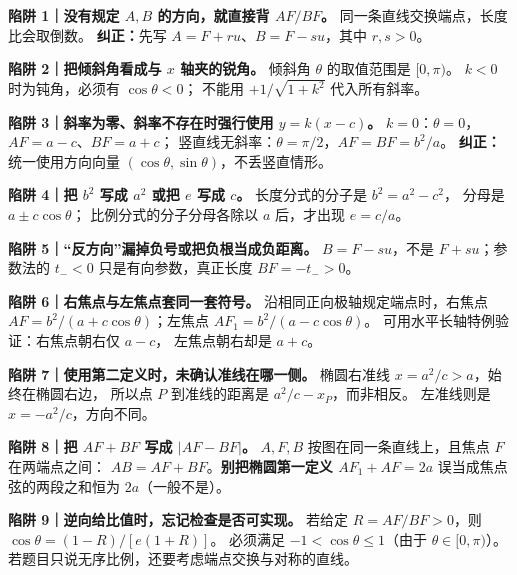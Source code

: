 \clearpage
\begin{trapbox}
\textbf{陷阱 1｜没有规定 $A,B$ 的方向，就直接背 $AF/BF$。}
同一条直线交换端点，长度比会取倒数。
\textbf{纠正：}先写 $A=F+ru$、$B=F-su$，其中 $r,s>0$。
\par\smallskip\noindent
\textbf{陷阱 2｜把倾斜角看成与 $x$ 轴夹的锐角。}
倾斜角 $\theta$ 的取值范围是 $[0,\pi)$。
$k<0$ 时为钝角，必须有 $\cos\theta<0$；
不能用 $+1/\sqrt{1+k^2}$ 代入所有斜率。
\par\smallskip\noindent
\textbf{陷阱 3｜斜率为零、斜率不存在时强行使用 $y=k(x-c)$。}
$k=0$：$\theta=0$，$AF=a-c$、$BF=a+c$；
竖直线无斜率：$\theta=\pi/2$，$AF=BF=b^2/a$。
\textbf{纠正：}统一使用方向向量 $(\cos\theta,\sin\theta)$，不丢竖直情形。
\par\smallskip\noindent
\textbf{陷阱 4｜把 $b^2$ 写成 $a^2$ 或把 $e$ 写成 $c$。}
长度分式的分子是 $b^2=a^2-c^2$，
分母是 $a\pm c\cos\theta$；
比例分式的分子分母各除以 $a$ 后，才出现 $e=c/a$。
\par\smallskip\noindent
\textbf{陷阱 5｜``反方向''漏掉负号或把负根当成负距离。}
$B=F-su$，不是 $F+su$；参数法的 $t_-<0$
只是有向参数，真正长度 $BF=-t_->0$。
\par\smallskip\noindent
\textbf{陷阱 6｜右焦点与左焦点套同一套符号。}
沿相同正向极轴规定端点时，右焦点
$AF=b^2/(a+c\cos\theta)$；左焦点
$AF_1=b^2/(a-c\cos\theta)$。
可用水平长轴特例验证：右焦点朝右仅 $a-c$，
左焦点朝右却是 $a+c$。
\par\smallskip\noindent
\textbf{陷阱 7｜使用第二定义时，未确认准线在哪一侧。}
椭圆右准线 $x=a^2/c>a$，始终在椭圆右边，
所以点 $P$ 到准线的距离是 $a^2/c-x_P$，而非相反。
左准线则是 $x=-a^2/c$，方向不同。
\par\smallskip\noindent
\textbf{陷阱 8｜把 $AF+BF$ 写成 $|AF-BF|$。}
$A,F,B$ 按图在同一条直线上，且焦点 $F$ 在两端点之间：
$AB=AF+BF$。\textbf{别把椭圆第一定义 $AF_1+AF=2a$}
误当成焦点弦的两段之和恒为 $2a$（一般不是）。
\par\smallskip\noindent
\textbf{陷阱 9｜逆向给比值时，忘记检查是否可实现。}
若给定 $R=AF/BF>0$，则
$\cos\theta=(1-R)/[e(1+R)]$。
必须满足 $-1<\cos\theta\le1$（由于 $\theta\in[0,\pi)$）。
若题目只说无序比例，还要考虑端点交换与对称的直线。
\end{trapbox}
